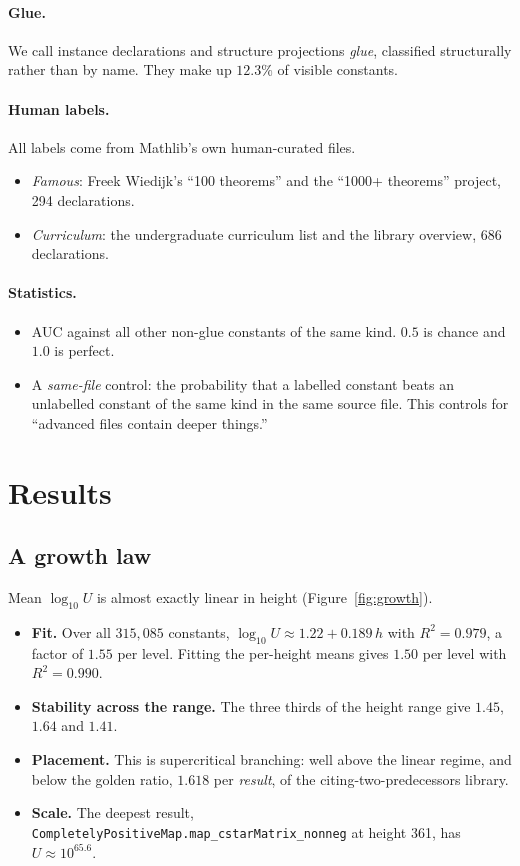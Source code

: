 \documentclass[11pt]{article}
\theoremstyle{remark}
\newcommand{\lean}[1]{\texttt{#1}}
\begin{document}
\paragraph{Glue.} We call instance declarations and structure projections \emph{glue},
classified structurally rather than by name. They make up $12.3\%$ of visible constants.

\paragraph{Human labels.} All labels come from Mathlib's own human-curated files.
\begin{itemize}
\item \emph{Famous}: Freek Wiedijk's ``100 theorems'' and the ``1000+ theorems'' project,
  294 declarations.
\item \emph{Curriculum}: the undergraduate curriculum list and the library overview, 686
  declarations.
\end{itemize}

\paragraph{Statistics.}
\begin{itemize}
\item AUC against all other non-glue constants of the same kind. $0.5$ is chance and
  $1.0$ is perfect.
\item A \emph{same-file} control: the probability that a labelled constant beats an
  unlabelled constant of the same kind in the same source file. This controls for
  ``advanced files contain deeper things.''
\end{itemize}

\section{Results}\label{sec:results}

\subsection{A growth law}

Mean $\log_{10}U$ is almost exactly linear in height (Figure~\ref{fig:growth}).
\begin{itemize}
\item \textbf{Fit.} Over all $315{,}085$ constants, $\log_{10}U\approx1.22+0.189\,h$
  with $R^2=0.979$, a factor of $1.55$ per level. Fitting the per-height means gives
  $1.50$ per level with $R^2=0.990$.
\item \textbf{Stability across the range.} The three thirds of the height range give
  $1.45$, $1.64$ and $1.41$.
\item \textbf{Placement.} This is supercritical branching: well above the linear regime,
  and below the golden ratio, $1.618$ per \emph{result}, of the citing-two-predecessors
  library.
\item \textbf{Scale.} The deepest result, \lean{CompletelyPositiveMap.map\_cstarMatrix\_nonneg}
  at height 361, has $U\approx10^{65.6}$.
\end{itemize}
\end{document}
